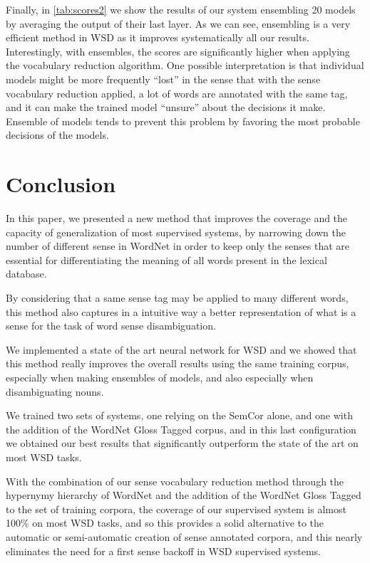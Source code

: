 \documentclass[11pt,a4paper]{article}
\begin{document}
Finally, in \autoref{tab:scores2} we show the results of our system ensembling 20 models by averaging the output of their last layer. As we can see, ensembling is a very efficient method in WSD as it improves systematically all our results. Interestingly, with ensembles, the scores are significantly higher when applying the vocabulary reduction algorithm. One possible interpretation is that individual models might be more frequently ``lost'' in the sense that with the sense vocabulary reduction applied, a lot of words are annotated with the same tag, and it can make the trained model ``unsure'' about the decisions it make. Ensemble of models tends to prevent this problem by favoring the most probable decisions of the models. 

\section{Conclusion}

In this paper, we presented a new method that improves the coverage and the capacity of generalization of most supervised systems, by narrowing down the number of different sense in WordNet in order to keep only the senses that are essential for differentiating the meaning of all words present in the lexical database.

By considering that a same sense tag may be applied to many different words, this method also captures in a intuitive way a better representation of what is a sense for the task of word sense disambiguation.

We implemented a state of the art neural network for WSD and we showed that this method really improves the overall results using the same training corpus, especially when making ensembles of models, and also especially when disambiguating nouns. 

We trained two sets of systems, one relying on the SemCor alone, and one with the addition of the WordNet Gloss Tagged corpus, and in this last configuration we obtained our best results that significantly outperform the state of the art on most WSD tasks.

With the combination of our sense vocabulary reduction method through the hypernymy hierarchy of WordNet and the addition of the WordNet Gloss Tagged to the set of training corpora, the coverage of our supervised system is almost 100\% on most WSD tasks, and so this provides a solid alternative to the automatic or semi-automatic creation of sense annotated corpora, and this nearly eliminates the need for a first sense backoff in WSD supervised systems. 

\clearpage




\end{document}
